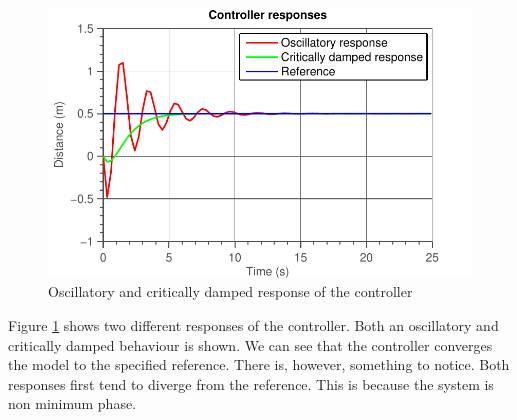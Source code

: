 \documentclass[11pt,titlepage]{report}
\begin{document}
\begin{figure}[H]
	\begin{center}
		\includegraphics[width=0.7\linewidth]{resource/controller.pdf}
	\end{center}
	\caption{Oscillatory and critically damped response of the controller}
	\label{fig:ass-2-controller-response}
\end{figure}

Figure \ref{fig:ass-2-controller-response} shows two different responses of the controller. Both an oscillatory and critically damped behaviour is shown. We can see that the controller converges the model to the specified reference. There is, however, something to notice. Both responses first tend to diverge from the reference. This is because the system is non minimum phase.
\end{document}
